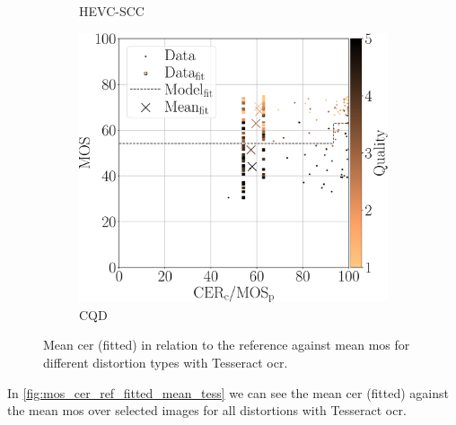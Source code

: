 \begin{figure}[h]
\begin{subfigure}[b]{0.3\textwidth}
        \caption{HEVC-SCC}
        \label{fig:mos_cer_ref_fitted_mean_tess_HEVC-SCC}
    \end{subfigure}
    \hfill
    \begin{subfigure}[b]{0.3\textwidth}
        \includegraphics[width=\textwidth]{../../images/analyze/mos_cer_ref_fitted_mean_tess_CQD.pdf}
        \caption{CQD}
        \label{fig:mos_cer_ref_fitted_mean_tess_CQD}
    \end{subfigure}
    \caption{Mean \gls{cer} (fitted) in relation to the reference against mean \gls{mos} for different distortion types with Tesseract \gls{ocr}.}
\label{fig:mos_cer_ref_fitted_mean_tess}
\end{figure}

In \autoref{fig:mos_cer_ref_fitted_mean_tess} we can see the mean \gls{cer} (fitted) against the mean \gls{mos} over selected images for all distortions with Tesseract \gls{ocr}.


